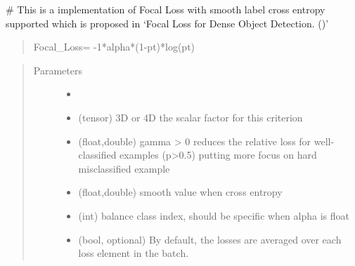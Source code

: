 \documentclass[letterpaper,10pt,english]{sphinxmanual}
\begin{document}
\begin{fulllineitems}
\label{\detokenize{index:pathflowai.losses.FocalLoss}}
\# 
This is a implementation of Focal Loss with smooth label cross entropy supported which is proposed in
‘Focal Loss for Dense Object Detection. ()’
\begin{quote}

Focal\_Loss= -1*alpha*(1-pt)*log(pt)
\end{quote}
\begin{quote}\begin{description}
\item[{Parameters}] \leavevmode\begin{itemize}
\item {} 
 \textendash{} 

\item {} 
 \textendash{} (tensor) 3D or 4D the scalar factor for this criterion

\item {} 
 \textendash{} (float,double) gamma \textgreater{} 0 reduces the relative loss for well-classified examples (p\textgreater{}0.5) putting more
focus on hard misclassified example

\item {} 
 \textendash{} (float,double) smooth value when cross entropy

\item {} 
 \textendash{} (int) balance class index, should be specific when alpha is float

\item {} 
 \textendash{} (bool, optional) By default, the losses are averaged over each loss element in the batch.

\end{itemize}

\end{description}\end{quote}

\end{fulllineitems}
\end{document}
